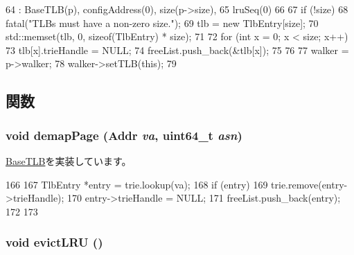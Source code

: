 \begin{DoxyCode}
64                         : BaseTLB(p), configAddress(0), size(p->size),
65     lruSeq(0)
66 {
67     if (!size)
68         fatal("TLBs must have a non-zero size.\n");
69     tlb = new TlbEntry[size];
70     std::memset(tlb, 0, sizeof(TlbEntry) * size);
71 
72     for (int x = 0; x < size; x++) {
73         tlb[x].trieHandle = NULL;
74         freeList.push_back(&tlb[x]);
75     }
76 
77     walker = p->walker;
78     walker->setTLB(this);
79 }
\end{DoxyCode}


\subsection{関数}
\hypertarget{classX86ISA_1_1TLB_a18477caae4a9699b99ee4f1ebca75c31}{
\subsubsection[{demapPage}]{\setlength{\rightskip}{0pt plus 5cm}void demapPage ({\bf Addr} {\em va}, \/  uint64\_\-t {\em asn})}}
\label{classX86ISA_1_1TLB_a18477caae4a9699b99ee4f1ebca75c31}


\hyperlink{classBaseTLB_aff4b9d01b9a4712c699cfb2dd9b3b8cd}{BaseTLB}を実装しています。


\begin{DoxyCode}
166 {
167     TlbEntry *entry = trie.lookup(va);
168     if (entry) {
169         trie.remove(entry->trieHandle);
170         entry->trieHandle = NULL;
171         freeList.push_back(entry);
172     }
173 }
\end{DoxyCode}
\hypertarget{classX86ISA_1_1TLB_ae59fbc0829276a4cd557c908baf052f0}{
\subsubsection[{evictLRU}]{\setlength{\rightskip}{0pt plus 5cm}void evictLRU ()}}
\label{classX86ISA_1_1TLB_ae59fbc0829276a4cd557c908baf052f0}



